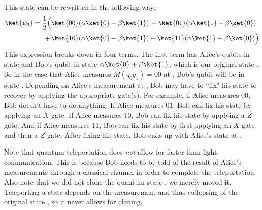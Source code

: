 \documentclass[11pt, notitlepage]{report}
\begin{document}
This state can be rewritten in the following way:
\begin{align*}
  \ket{\psi_3} = \dfrac{1}{2}\Big(&\ket{00}(\alpha\ket{0} + \beta{\ket{1}}) \, + \ket{01}(\alpha\ket{1} + \beta\ket{0}) \\
  + \, &\ket{10}(\alpha\ket{0} - \beta\ket{1}) + \ket{11}(\alpha\ket{1} - \beta\ket{0})\Big)
\end{align*}
This expression breaks down in four terms. The first term has Alice's qubits in state  and Bob's qubit in state $\alpha\ket{0} + \beta\ket{1}$, which is our original state \ket{\phi}. So in the case that Alice measures $M(q_0q_1) = 00$ at , Bob's qubit will be in state \ket{\phi}. Depending on Alice's measurement at , Bob may have to ``fix" his state to recover \ket{\phi} by applying the appropriate gate(s). For example, if Alice measures 00, Bob doesn't have to do anything. If Alice measures 01, Bob can fix his state by applying an $X$ gate. If Alice measures 10, Bob can fix his state by applying a $Z$ gate. And if Alice measures 11, Bob can fix his state by first applying an $X$ gate and then a $Z$ gate. After fixing his state, Bob ends up with Alice's state \ket{\phi} at .

Note that quantum teleportation does \emph{not} allow for faster than light communication. This is because Bob needs to be told of the result of Alice's measurements through a classical channel in order to complete the teleportation. Also note that we did not clone the quantum state \ket{\phi}, we merely moved it. Teleporting a state depends on the measurement and thus collapsing of the original state \ket{\phi}, so it never allows for cloning.
\end{document}
